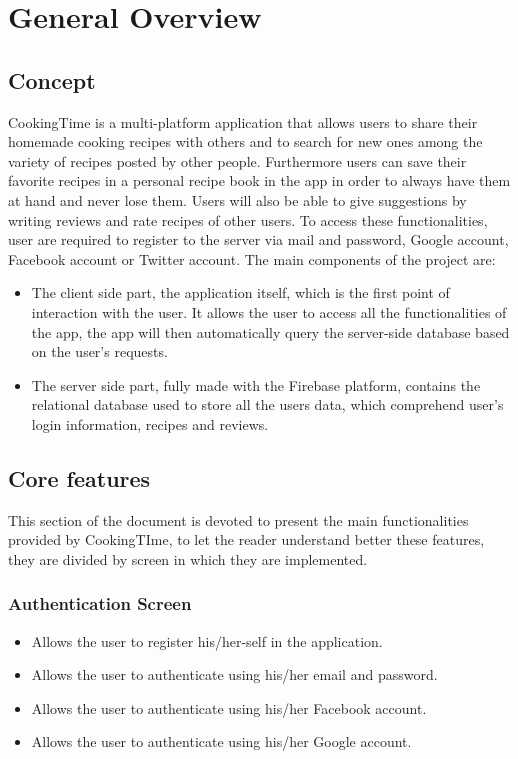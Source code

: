 \chapter{General Overview}

\section{Concept}
	CookingTime is a multi-platform application that allows users to share their homemade cooking recipes with others and to search for new ones among the variety of recipes posted by other people.
	Furthermore users can save their favorite recipes in a personal recipe book in the app in order to always have them at hand and never lose them.
	Users will also be able to give suggestions by writing reviews and rate recipes of other users.
	To access these functionalities, user are required to register to the server via mail and password, Google account, Facebook account or Twitter account.
	The main components of the project are:
	\begin{itemize}
		\item The client side part, the application itself, which is the first point of interaction with the user.
		It allows the user to access all the functionalities of the app, the app will then automatically query the server-side database based on the user's requests.
		
		\item The server side part, fully made with the Firebase platform, contains the relational database used to store all the users data, which comprehend user's login information, recipes and reviews.
	\end{itemize}


\section{Core features}
	This section of the document is devoted to present the main functionalities provided by CookingTIme, to let the reader understand better these features, 
	they are divided by screen in which they are implemented.
	
	\subsection{Authentication Screen}
		\begin{itemize}
			\item Allows the user to register his/her-self in the application.
		
			\item Allows the user to authenticate using his/her email and password.
			
			\item Allows the user to authenticate using his/her Facebook account.
			
			\item Allows the user to authenticate using his/her Google account.
		\end{itemize}


